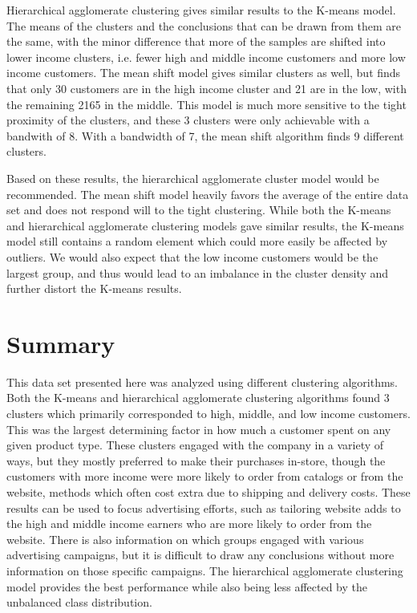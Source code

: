\documentclass[12pt]{article}
\begin{document}
Hierarchical agglomerate clustering gives similar results to the K-means model. The means of the clusters and the conclusions that can be drawn from them are the same, with the minor difference that more of the samples are shifted into lower income clusters, i.e. fewer high and middle income customers and more low income customers. The mean shift model gives similar clusters as well, but finds that only 30 customers are in the high income cluster and 21 are in the low, with the remaining 2165 in the middle. This model is much more sensitive to the tight proximity of the clusters, and these 3 clusters were only achievable with a bandwith of 8. With a bandwidth of 7, the mean shift algorithm finds 9 different clusters. 


Based on these results, the hierarchical agglomerate cluster model would be recommended. The mean shift model heavily favors the average of the entire data set and does not respond will to the tight clustering. While both the K-means and hierarchical agglomerate clustering models gave similar results, the K-means model still contains a random element which could more easily be affected by outliers. We would also expect that the low income customers would be the largest group, and thus would  lead to an imbalance in the cluster density and further distort the K-means results. 

\section*{Summary}


This data set presented here was analyzed using different clustering algorithms. Both the K-means and hierarchical agglomerate clustering algorithms found 3 clusters which primarily corresponded to high, middle, and low income customers. This was the largest determining factor in how much a customer spent on any given product type. These clusters engaged with the company in a variety of ways, but they mostly preferred to make their purchases in-store, though the customers with more income were more likely to order from catalogs or from the website, methods which often cost extra due to shipping and delivery costs. These results can be used to focus advertising efforts, such as tailoring website adds to the high and middle income earners who are more likely to order from the website. There is also information on which groups engaged with various advertising campaigns, but it is difficult to draw any conclusions without more information on those specific campaigns. The hierarchical agglomerate clustering model provides the best performance while also being less affected by the unbalanced class distribution. 
\end{document}
